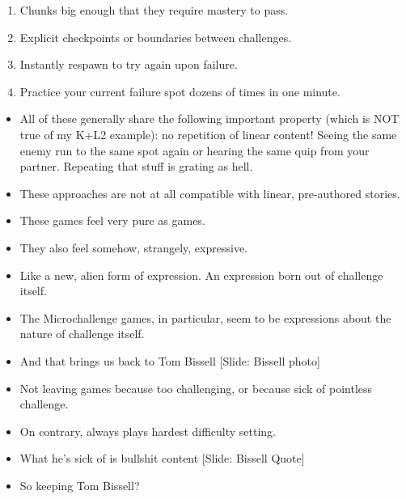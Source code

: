 \documentclass[12pt]{article}
\begin{document}
{\begin{enumerate}
\begin{enumerate}
  \item Chunks big enough that they require mastery to pass.

  \item Explicit checkpoints or boundaries between challenges.

  \item Instantly respawn to try again upon failure.

  \item Practice your current failure spot dozens of times in one minute.
\end{enumerate}

\end{enumerate}


\begin{itemize}


\item All of these generally share the following important property (which is NOT true of my K+L2 example):  no repetition of linear content!  Seeing the same enemy run to the same spot again or hearing the same quip from your partner.  Repeating that stuff is grating as hell.


\item These approaches are not at all compatible with linear, pre-authored stories.

\item These games feel very pure as games.

\item They also feel somehow, strangely, expressive.

\item Like a new, alien form of expression.  An expression born out of challenge itself.

\item The Microchallenge games, in particular, seem to be expressions about the nature of challenge itself.


\item And that brings us back to Tom Bissell [Slide:  Bissell photo]


\item Not leaving games because too challenging, or because sick of pointless challenge.

\item On contrary, always plays hardest difficulty setting.

\item What he's sick of is bullshit content [Slide:  Bissell Quote]


\item So keeping Tom Bissell?


\end{itemize}}
\end{document}
